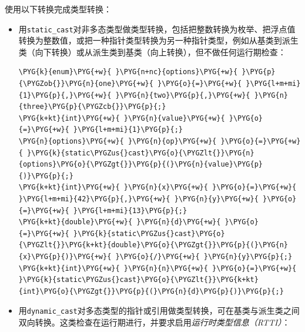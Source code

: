 
使用以下转换完成类型转换：



\begin{itemize}
\item 用\texttt{static\_\allowbreak{}cast}对非多态类型做类型转换，包括把整数转换为枚举、把浮点值转换为整数值，或把一种指针类型转换为另一种指针类型，例如从基类到派生类（向下转换）或从派生类到基类（向上转换），但不做任何运行期检查：



\begin{codeblockbg}
\begin{Verbatim}[commandchars=\\\{\},breaklines=true,breakanywhere=true,fontsize=\codefont,xleftmargin=17bp]
\PYG{k}{enum}\PYG{+w}{ }\PYG{n+nc}{options}\PYG{+w}{ }\PYG{p}{\PYGZob{}}\PYG{n}{one}\PYG{+w}{ }\PYG{o}{=}\PYG{+w}{ }\PYG{l+m+mi}{1}\PYG{p}{,}\PYG{+w}{ }\PYG{n}{two}\PYG{p}{,}\PYG{+w}{ }\PYG{n}{three}\PYG{p}{\PYGZcb{}}\PYG{p}{;}
\PYG{k+kt}{int}\PYG{+w}{ }\PYG{n}{value}\PYG{+w}{ }\PYG{o}{=}\PYG{+w}{ }\PYG{l+m+mi}{1}\PYG{p}{;}
\PYG{n}{options}\PYG{+w}{ }\PYG{n}{op}\PYG{+w}{ }\PYG{o}{=}\PYG{+w}{ }\PYG{k}{static\PYGZus{}cast}\PYG{o}{\PYGZlt{}}\PYG{n}{options}\PYG{o}{\PYGZgt{}}\PYG{p}{(}\PYG{n}{value}\PYG{p}{)}\PYG{p}{;}
\PYG{k+kt}{int}\PYG{+w}{ }\PYG{n}{x}\PYG{+w}{ }\PYG{o}{=}\PYG{+w}{ }\PYG{l+m+mi}{42}\PYG{p}{,}\PYG{+w}{ }\PYG{n}{y}\PYG{+w}{ }\PYG{o}{=}\PYG{+w}{ }\PYG{l+m+mi}{13}\PYG{p}{;}
\PYG{k+kt}{double}\PYG{+w}{ }\PYG{n}{d}\PYG{+w}{ }\PYG{o}{=}\PYG{+w}{ }\PYG{k}{static\PYGZus{}cast}\PYG{o}{\PYGZlt{}}\PYG{k+kt}{double}\PYG{o}{\PYGZgt{}}\PYG{p}{(}\PYG{n}{x}\PYG{p}{)}\PYG{+w}{ }\PYG{o}{/}\PYG{+w}{ }\PYG{n}{y}\PYG{p}{;}
\PYG{k+kt}{int}\PYG{+w}{ }\PYG{n}{n}\PYG{+w}{ }\PYG{o}{=}\PYG{+w}{ }\PYG{k}{static\PYGZus{}cast}\PYG{o}{\PYGZlt{}}\PYG{k+kt}{int}\PYG{o}{\PYGZgt{}}\PYG{p}{(}\PYG{n}{d}\PYG{p}{)}\PYG{p}{;}
\end{Verbatim}
\end{codeblockbg}



\item 用\texttt{dynamic\_\allowbreak{}cast}对多态类型的指针或引用做类型转换，可在基类与派生类之间双向转换。这类检查在运行期进行，并要求启用\textit{运行时类型信息（RTTI）}：



\end{itemize}
